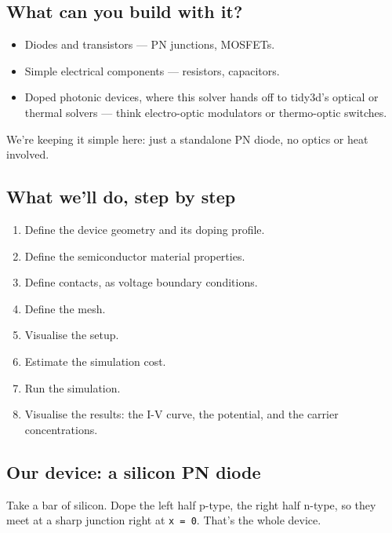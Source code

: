 \documentclass[11pt]{article}
\providecommand{\tightlist}{%
      \setlength{\itemsep}{0pt}\setlength{\parskip}{0pt}}
\begin{document}
    \subsection{What can you build with
it?}\label{what-can-you-build-with-it}

\begin{itemize}
\tightlist
\item
  Diodes and transistors --- PN junctions, MOSFETs.
\item
  Simple electrical components --- resistors, capacitors.
\item
  Doped photonic devices, where this solver hands off to tidy3d's
  optical or thermal solvers --- think electro-optic modulators or
  thermo-optic switches.
\end{itemize}

We're keeping it simple here: just a standalone PN diode, no optics or
heat involved.

    \subsection{What we'll do, step by
step}\label{what-well-do-step-by-step}

\begin{enumerate}
\def\labelenumi{\arabic{enumi}.}
\tightlist
\item
  Define the device geometry and its doping profile.
\item
  Define the semiconductor material properties.
\item
  Define contacts, as voltage boundary conditions.
\item
  Define the mesh.
\item
  Visualise the setup.
\item
  Estimate the simulation cost.
\item
  Run the simulation.
\item
  Visualise the results: the I-V curve, the potential, and the carrier
  concentrations.
\end{enumerate}

    \subsection{Our device: a silicon PN
diode}\label{our-device-a-silicon-pn-diode}

Take a bar of silicon. Dope the left half p-type, the right half n-type,
so they meet at a sharp junction right at \texttt{x\ =\ 0}. That's the
whole device.
\end{document}
